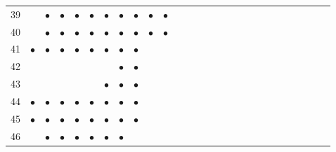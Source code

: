 \documentclass[text.tex]{subfiles}
\begin{document}
\begin{table}
{\begin{tabular}{l|cccccccccccccccccccccccccc}
39  &           & $\bullet$ & $\bullet$ & $\bullet$ & $\bullet$ & $\bullet$ & $\bullet$ & $\bullet$ & $\bullet$ & $\bullet$ &           &           &           &           &           &           &           &           &           &           &           &           &           &           &           \\
40  &           & $\bullet$ & $\bullet$ & $\bullet$ & $\bullet$ & $\bullet$ & $\bullet$ & $\bullet$ & $\bullet$ & $\bullet$ &           &           &           &           &           &           &           &           &           &           &           &           &           &           &           \\
41  & $\bullet$ & $\bullet$ & $\bullet$ & $\bullet$ & $\bullet$ & $\bullet$ & $\bullet$ & $\bullet$ &           &           &           &           &           &           &           &           &           &           &           &           &           &           &           &           &           \\ 
42  &           &           &           &           &           &           & $\bullet$ & $\bullet$ &           &           &           &           &           &           &           &           &           &           &           &           &           &           &           &           &           \\
43  &           &           &           &           &           & $\bullet$ & $\bullet$ & $\bullet$ &           &           &           &           &           &           &           &           &           &           &           &           &           &           &           &           &           \\
44  & $\bullet$ & $\bullet$ & $\bullet$ & $\bullet$ & $\bullet$ & $\bullet$ & $\bullet$ & $\bullet$ &           &           &           &           &           &           &           &           &           &           &           &           &           &           &           &           &           \\
45  & $\bullet$ & $\bullet$ & $\bullet$ & $\bullet$ & $\bullet$ & $\bullet$ & $\bullet$ & $\bullet$ &           &           &           &           &           &           &           &           &           &           &           &           &           &           &           &           &           \\ 
46  &           & $\bullet$ & $\bullet$ & $\bullet$ & $\bullet$ & $\bullet$ & $\bullet$ &           &           &           &           &           &           &           &           &           &           &           &           &           &           &           &           &           &           \\

\end{tabular}}
\end{table}
\end{document}
